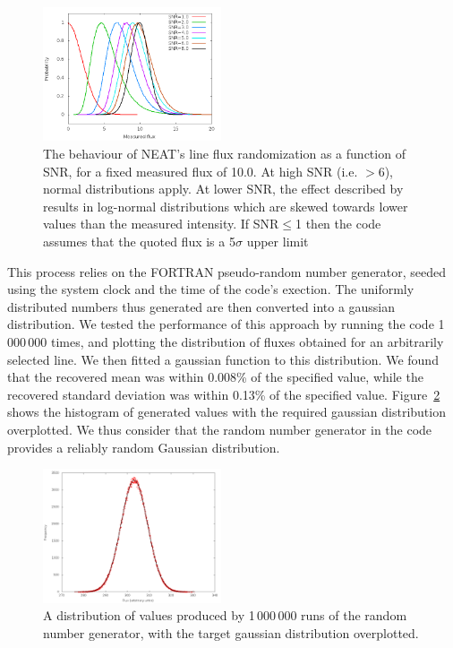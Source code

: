 \documentclass[useAMS,usenatbib]{mn2e}
\begin{document}
\begin{figure}
\label{distributions}
\includegraphics[width=0.47\textwidth]{figures/distributions_2.png}
\caption{The behaviour of NEAT's line flux randomization as a function of SNR, for a fixed measured flux of 10.0.  At high SNR (i.e. $>$6), normal distributions apply.  At lower SNR, the effect described by \citet{1994A&A...287..676R} results in log-normal distributions which are skewed towards lower values than the measured intensity.  If SNR$\leq$1 then the code assumes that the quoted flux is a 5$\sigma$ upper limit}
\end{figure}

This process relies on the FORTRAN pseudo-random number generator, seeded using the system clock and the time of the code's exection.  The uniformly distributed numbers thus generated are then converted into a gaussian distribution.  We tested the performance of this approach by running the code 1\,000\,000 times, and plotting the distribution of fluxes obtained for an arbitrarily selected line.  We then fitted a gaussian function to this distribution.  We found that the recovered mean was within 0.008\% of the specified value, while the recovered standard deviation was within 0.13\% of the specified value.  Figure~\ref{gaussiantest} shows the histogram of generated values with the required gaussian distribution overplotted.  We thus consider that the random number generator in the code provides a reliably random Gaussian distribution.

\begin{figure}
\includegraphics[width=0.47\textwidth]{figures/gaussian_test.png}
\caption{A distribution of values produced by 1\,000\,000 runs of the random number generator, with the target gaussian distribution overplotted.}
\label{gaussiantest}
\end{figure}
\end{document}
